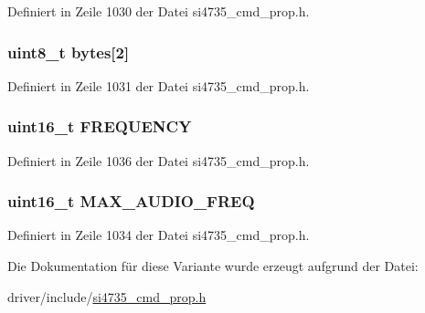 Definiert in Zeile 1030 der Datei si4735\+\_\+cmd\+\_\+prop.\+h.

\hypertarget{unionfm__hicut__cutoff__freq_a46e4c05d20a047ec169f60d3167e912e}{}
\subsubsection[{bytes}]{\setlength{\rightskip}{0pt plus 5cm}uint8\+\_\+t bytes\mbox{[}2\mbox{]}}\label{unionfm__hicut__cutoff__freq_a46e4c05d20a047ec169f60d3167e912e}


Definiert in Zeile 1031 der Datei si4735\+\_\+cmd\+\_\+prop.\+h.

\hypertarget{unionfm__hicut__cutoff__freq_ae5c18357d97abed93b49dc2a61421ace}{}
\subsubsection[{F\+R\+E\+Q\+U\+E\+N\+C\+Y}]{\setlength{\rightskip}{0pt plus 5cm}uint16\+\_\+t F\+R\+E\+Q\+U\+E\+N\+C\+Y}\label{unionfm__hicut__cutoff__freq_ae5c18357d97abed93b49dc2a61421ace}


Definiert in Zeile 1036 der Datei si4735\+\_\+cmd\+\_\+prop.\+h.

\hypertarget{unionfm__hicut__cutoff__freq_aada3ed206e51efd8ab2ef338686c3a33}{}
\subsubsection[{M\+A\+X\+\_\+\+A\+U\+D\+I\+O\+\_\+\+F\+R\+E\+Q}]{\setlength{\rightskip}{0pt plus 5cm}uint16\+\_\+t M\+A\+X\+\_\+\+A\+U\+D\+I\+O\+\_\+\+F\+R\+E\+Q}\label{unionfm__hicut__cutoff__freq_aada3ed206e51efd8ab2ef338686c3a33}


Definiert in Zeile 1034 der Datei si4735\+\_\+cmd\+\_\+prop.\+h.



Die Dokumentation für diese Variante wurde erzeugt aufgrund der Datei\+:\begin{DoxyCompactItemize}
\item 
driver/include/\hyperlink{si4735__cmd__prop_8h}{si4735\+\_\+cmd\+\_\+prop.\+h}\end{DoxyCompactItemize}
